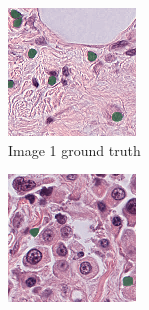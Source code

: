 \begin{figure}[H]
  \begin{subfigure}[b]{0.32\textwidth}
    \centering
    \includegraphics[width=\linewidth]{assets/images/for_presentation/exp1-1-gt.png}
    \caption{Image 1 ground truth}
  \end{subfigure}\hfill
  \begin{subfigure}[b]{0.32\textwidth}
    \centering
    \includegraphics[width=\linewidth]{assets/images/for_presentation/exp1-2-gt.png}

\end{subfigure}
\end{figure}
